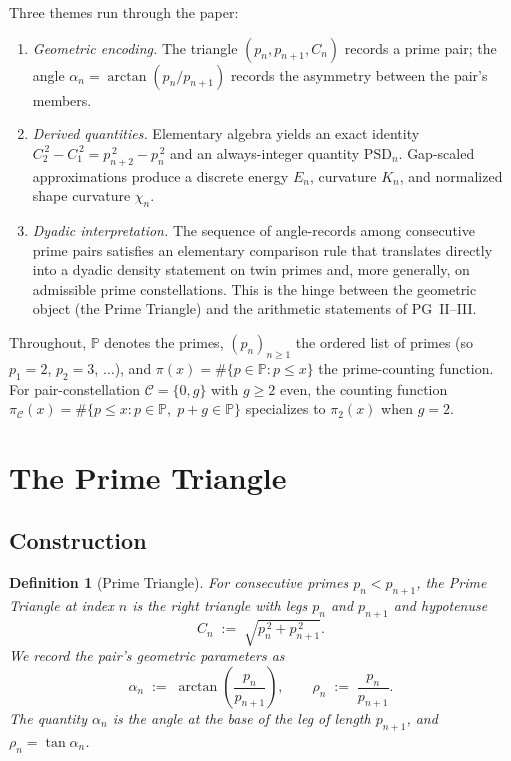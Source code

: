 \documentclass[11pt]{article}
\newtheorem{definition}[theorem]{Definition}
\begin{document}
Three themes run through the paper:
\begin{enumerate}
\item[(1)] \emph{Geometric encoding.} The triangle
$(p_n, p_{n+1}, C_n)$ records a prime pair; the angle
$\alpha_n = \arctan(p_n/p_{n+1})$ records the asymmetry between the
pair's members.
\item[(2)] \emph{Derived quantities.} Elementary algebra yields an
exact identity $C_2^{\,2} - C_1^{\,2} = p_{n+2}^{\,2} - p_n^{\,2}$
and an always-integer quantity $\mathrm{PSD}_n$. Gap-scaled
approximations produce a discrete energy $E_n$, curvature $K_n$, and
normalized shape curvature $\chi_n$.
\item[(3)] \emph{Dyadic interpretation.} The sequence of
angle-records among consecutive prime pairs satisfies an
elementary comparison rule that translates directly into a dyadic
density statement on twin primes and, more generally, on admissible
prime constellations. This is the hinge between the geometric
object (the Prime Triangle) and the arithmetic statements of
PG~II--III.
\end{enumerate}

Throughout, $\mathbb{P}$ denotes the primes, $(p_n)_{n\ge 1}$ the
ordered list of primes (so $p_1 = 2$, $p_2 = 3$, $\ldots$), and
$\pi(x) = \#\{p \in \mathbb{P} : p \le x\}$ the prime-counting
function. For pair-constellation $\mathcal{C} = \{0, g\}$ with
$g \ge 2$ even, the counting function
$\pi_{\mathcal{C}}(x) = \#\{p \le x : p \in \mathbb{P},\;p+g \in \mathbb{P}\}$
specializes to $\pi_2(x)$ when $g = 2$.

\section{The Prime Triangle}

\subsection{Construction}

\begin{definition}[Prime Triangle]
For consecutive primes $p_n < p_{n+1}$, the \emph{Prime Triangle}
at index $n$ is the right triangle with legs $p_n$ and $p_{n+1}$
and hypotenuse
\[
C_n \;:=\; \sqrt{p_n^{\,2} + p_{n+1}^{\,2}}.
\]
We record the pair's geometric parameters as
\[
\alpha_n \;:=\; \arctan\!\left(\frac{p_n}{p_{n+1}}\right),
\qquad
\rho_n \;:=\; \frac{p_n}{p_{n+1}}.
\]
The quantity $\alpha_n$ is the angle at the base of the leg of
length $p_{n+1}$, and $\rho_n = \tan \alpha_n$.
\end{definition}
\end{document}
